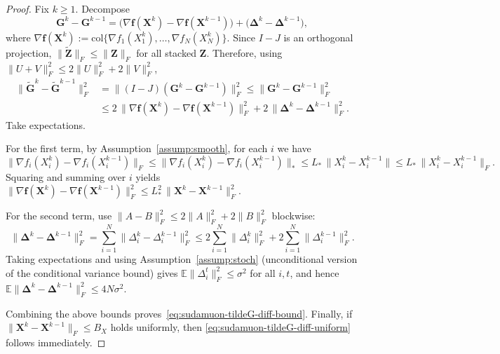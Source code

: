 \documentclass{article}
\begin{document}
\begin{proof}
Fix $k\ge 1$. Decompose
\[
\mathbf G^k-\mathbf G^{k-1}
= \bigl(\nabla \mathbf f(\mathbf X^k)-\nabla \mathbf f(\mathbf X^{k-1})\bigr)
+ \bigl(\mathbf\Delta^k-\mathbf\Delta^{k-1}\bigr),
\]
where $\nabla \mathbf f(\mathbf X^k):=\mathrm{col}\{\nabla f_1(X_1^k),\ldots,\nabla f_N(X_N^k)\}$.
Since $I-J$ is an orthogonal projection, $\|\tilde{\mathbf Z}\|_F\le \|\mathbf Z\|_F$ for all stacked $\mathbf Z$.
Therefore, using $\|U+V\|_F^2\le 2\|U\|_F^2+2\|V\|_F^2$,
\begin{align*}
\|\tilde{\mathbf G}^k-\tilde{\mathbf G}^{k-1}\|_F^2
&= \| (I-J)(\mathbf G^k-\mathbf G^{k-1})\|_F^2
\le \|\mathbf G^k-\mathbf G^{k-1}\|_F^2 \\
&\le 2\,\|\nabla \mathbf f(\mathbf X^k)-\nabla \mathbf f(\mathbf X^{k-1})\|_F^2
+2\,\|\mathbf\Delta^k-\mathbf\Delta^{k-1}\|_F^2.
\end{align*}
Take expectations.

For the first term, by Assumption~\ref{assump:smooth}, for each $i$ we have
\[
\|\nabla f_i(X_i^k)-\nabla f_i(X_i^{k-1})\|_F
\le \|\nabla f_i(X_i^k)-\nabla f_i(X_i^{k-1})\|_*
\le L_*\,\|X_i^k-X_i^{k-1}\|
\le L_*\,\|X_i^k-X_i^{k-1}\|_F.
\]
Squaring and summing over $i$ yields
$\|\nabla \mathbf f(\mathbf X^k)-\nabla \mathbf f(\mathbf X^{k-1})\|_F^2\le L_*^2\,\|\mathbf X^k-\mathbf X^{k-1}\|_F^2$.

For the second term, use $\|A-B\|_F^2\le 2\|A\|_F^2+2\|B\|_F^2$ blockwise:
\[
\|\mathbf\Delta^k-\mathbf\Delta^{k-1}\|_F^2
=\sum_{i=1}^N \|\Delta_i^k-\Delta_i^{k-1}\|_F^2
\le 2\sum_{i=1}^N\|\Delta_i^k\|_F^2+2\sum_{i=1}^N\|\Delta_i^{k-1}\|_F^2.
\]
Taking expectations and using Assumption~\ref{assump:stoch} (unconditional version of the conditional variance bound) gives
$\mathbb{E}\|\Delta_i^t\|_F^2\le \sigma^2$ for all $i,t$, and hence
$\mathbb{E}\|\mathbf\Delta^k-\mathbf\Delta^{k-1}\|_F^2\le 4N\sigma^2$.

Combining the above bounds proves~\eqref{eq:sudamuon-tildeG-diff-bound}.
Finally, if $\|\mathbf X^k-\mathbf X^{k-1}\|_F\le B_X$ holds uniformly, then
\eqref{eq:sudamuon-tildeG-diff-uniform} follows immediately.
\end{proof}
\end{document}
